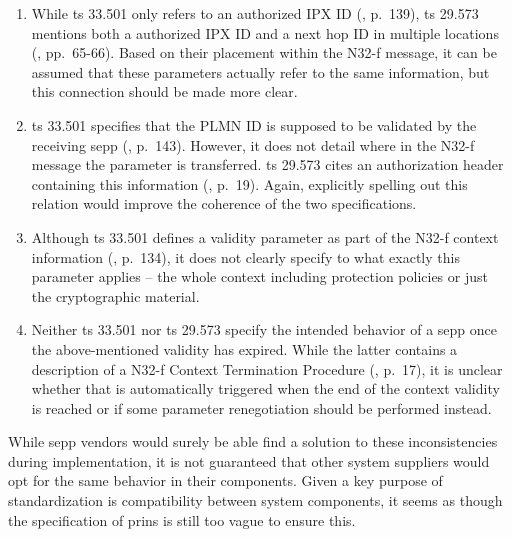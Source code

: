 \begin{enumerate}[label=--]
\item While \gls{ts} 33.501 only refers to an {\sffamily authorized IPX ID} (\cite{3gpp.33.501}, p.~139), \gls{ts} 29.573 mentions both a {\sffamily authorized IPX ID} and a {\sffamily next hop ID} in multiple locations (\cite{3gpp.29.573}, pp.~65-66). Based on their placement within the N32-f message, it can be assumed that these parameters actually refer to the same information, but this connection should be made more clear.

\item \gls{ts} 33.501 specifies that the {\sffamily PLMN ID} is supposed to be validated by the receiving \gls{sepp} (\cite{3gpp.33.501}, p.~143). However, it does not detail where in the N32-f message the parameter is transferred. \gls{ts} 29.573 cites an authorization header containing this information (\cite{3gpp.29.573}, p.~19). Again, explicitly spelling out this relation would improve the coherence of the two specifications.

\item Although \gls{ts} 33.501 defines a validity parameter as part of the N32-f context information (\cite{3gpp.33.501}, p.~134), it does not clearly specify to what exactly this parameter applies -- the whole context including protection policies or just the cryptographic material.

\item Neither \gls{ts} 33.501 nor \gls{ts} 29.573 specify the intended behavior of a \gls{sepp} once the above-mentioned validity has expired. While the latter contains a description of a N32-f Context Termination Procedure (\cite{3gpp.29.573}, p.~17), it is unclear whether that is automatically triggered when the end of the context validity is reached or if some parameter renegotiation should be performed instead.
\end{enumerate}

While \gls{sepp} vendors would surely be able find a solution to these inconsistencies during implementation, it is not guaranteed that other system suppliers would opt for the same behavior in their components.
Given a key purpose of standardization is compatibility between system components, it seems as though the specification of \gls{prins} is still too vague to ensure this.